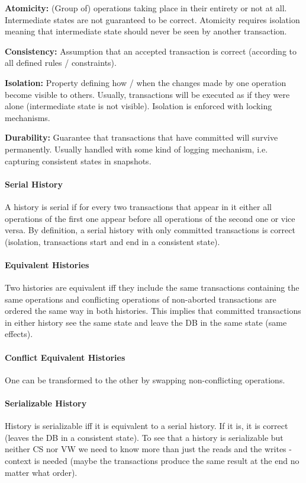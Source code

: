 \textbf{Atomicity:} (Group of) operations taking place in their entirety or not at all. Intermediate states are not guaranteed to be correct. Atomicity requires isolation meaning that intermediate state should never be seen by another transaction.

\textbf{Consistency:} Assumption that an accepted transaction is correct (according to all defined rules / constraints).

\textbf{Isolation:} Property defining how / when the changes made by one operation become visible to others. Usually, transactions will be executed as if they were alone (intermediate state is not visible). Isolation is enforced with locking mechanisms.

\textbf{Durability:} Guarantee that transactions that have committed will survive permanently. Usually handled with some kind of logging mechanism, i.e. capturing consistent states in snapshots.

\paragraph{Serial History}
A history is serial if for every two transactions that appear in it either all operations of the first one appear before all operations of the second one or vice versa. By definition, a serial history with only committed transactions is correct (isolation, transactions start and end in a consistent state).

\paragraph{Equivalent Histories}
Two histories are equivalent iff they include the same transactions containing the same operations and conflicting operations of non-aborted transactions are ordered the same way in both histories. This implies that committed transactions in either history see the same state and leave the DB in the same state (same effects).

\paragraph{Conflict Equivalent Histories}
One can be transformed to the other by swapping non-conflicting operations.

\paragraph{Serializable History}
History is  serializable iff it is equivalent to a serial history. If it is, it is correct (leaves the DB in a consistent state). To see that a history is serializable but neither CS nor VW we need to know more than just the reads and the writes - context is needed (maybe the transactions produce the same result at the end no matter what order).

